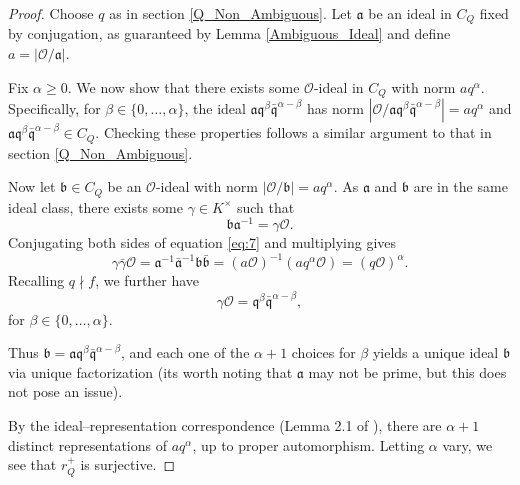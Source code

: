\documentclass[11pt]{amsart}
\theoremstyle{definition}
\begin{document}
\begin{proof}
    Choose $q$ as in section \ref{Q_Non_Ambiguous}. Let $\mathfrak{a}$ be an ideal in $C_Q$ fixed by conjugation, as guaranteed by Lemma \ref{Ambiguous_Ideal} and define $a=|\mathcal{O}/\mathfrak{a}|$.

    Fix $\alpha\geq 0$. We now show that there exists some $\mathcal{O}$-ideal in $C_Q$ with norm $aq^{\alpha}$. Specifically, for $\beta\in\{0,\dots,\alpha\}$, the ideal $\mathfrak{a}\mathfrak{q}^\beta\bar{\mathfrak{q}}^{\alpha-\beta}$ has norm $|\mathcal{O}/\mathfrak{a}\mathfrak{q}^\beta\bar{\mathfrak{q}}^{\alpha-\beta}|=aq^\alpha$ and $\mathfrak{a}\mathfrak{q}^\beta\bar{\mathfrak{q}}^{\alpha-\beta}\in C_Q$. Checking these properties follows a similar argument to that in section \ref{Q_Non_Ambiguous}.

    Now let $\mathfrak{b}\in C_Q$ be an $\mathcal{O}$-ideal with norm $|\mathcal{O}/\mathfrak{b}|=aq^{\alpha}$. As $\mathfrak{a}$ and $\mathfrak{b}$ are in the same ideal class, there exists some $\gamma\in K^\times$ such that
    \begin{equation}\label{eq:7}
        \mathfrak{b}\mathfrak{a}^{-1}=\gamma\mathcal{O}.
    \end{equation}
    Conjugating both sides of equation \ref{eq:7} and multiplying gives 
    \[
        \gamma\bar{\gamma}\mathcal{O}=\mathfrak{a}^{-1}\mathfrak{\bar{a}}^{-1}\mathfrak{b}\mathfrak{\bar{b}}=(a\mathcal{O})^{-1}(aq^\alpha\mathcal{O})=(q\mathcal{O})^\alpha.
    \]
    Recalling $q\nmid f$, we further have
    \begin{equation}\label{eq:8}
        \gamma\mathcal{O}=\mathfrak{q}^{\beta}\mathfrak{\bar{q}}^{\alpha-
        \beta},
    \end{equation}
    for $\beta\in\{0,\dots, \alpha\}$.

    Thus $\mathfrak{b}=\mathfrak{a}\mathfrak{q}^{\beta}\mathfrak{\bar{q}}^{\alpha-\beta}$, and each one of the $\alpha+1$ choices for $\beta$ yields a unique ideal $\mathfrak{b}$ via unique factorization (its worth noting that $\mathfrak{a}$ may not be prime, but this does not pose an issue).

    By the ideal--representation correspondence (Lemma 2.1 of \cite{BG06}), there are $\alpha+1$ distinct representations of $aq^{\alpha}$, up to proper automorphism. Letting $\alpha$ vary, we see that $r_Q^+$ is surjective.
\end{proof}
\end{document}
